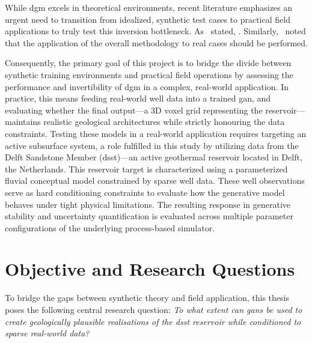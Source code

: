 While \gls{dgm} excels in theoretical environments, recent literature emphasizes an urgent need to transition from idealized, synthetic test cases to practical field applications to truly test this inversion bottleneck. As~\textcite{rongier2025atowards} stated, . Similarly,~\textcite{federico2025three} noted that the application of the overall methodology to real cases should be performed. 

Consequently, the primary goal of this project is to bridge the divide between synthetic training environments and practical field operations by assessing the performance and invertibility of \gls{dgm} in a complex, real-world application. In practice, this means feeding real-world well data into a trained \gls{gan}, and evaluating whether the final output—a 3D voxel grid representing the reservoir—maintains realistic geological architectures while strictly honouring the data constraints. Testing these models in a real-world application requires targeting an active subsurface system, a role fulfilled in this study by utilizing data from the Delft Sandstone Member (\gls{dsst})—an active geothermal reservoir located in Delft, the Netherlands. This reservoir target is characterized using a parameterized fluvial conceptual model constrained by sparse well data. These well observations serve as hard conditioning constraints to evaluate how the generative model behaves under tight physical limitations. The resulting response in generative stability and uncertainty quantification is evaluated across multiple parameter configurations of the underlying process-based simulator. 

\section{Objective and Research Questions}
To bridge the gaps between synthetic theory and field application, this thesis poses the following central research question: 
\textit{To what extent can \glspl{gan} be used to create geologically plausible realisations of the \gls{dsst} reservoir while conditioned to sparse real-world data?}

